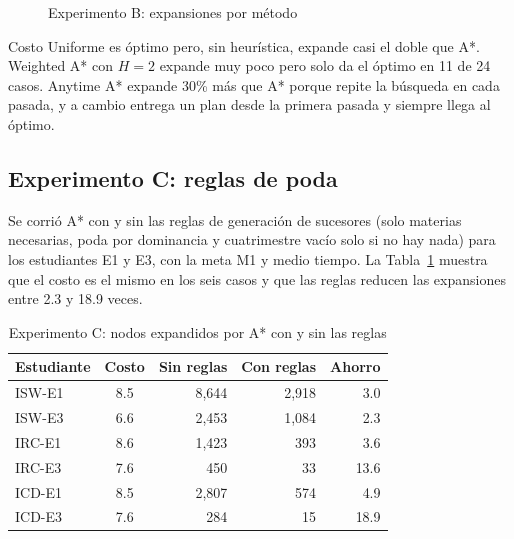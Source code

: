 \begin{figure}[H]
    \centering
    \caption{Experimento B: expansiones por método}
    \label{FIG::ExpB}
\end{figure}

Costo Uniforme es óptimo pero, sin heurística, expande casi el doble que A*. Weighted A* con $H = 2$ expande muy poco pero solo da el óptimo en 11 de 24 casos. Anytime A* expande 30\% más que A* porque repite la búsqueda en cada pasada, y a cambio entrega un plan desde la primera pasada y siempre llega al óptimo.

\subsection{Experimento C: reglas de poda}
Se corrió A* con y sin las reglas de generación de sucesores (solo materias necesarias, poda por dominancia y cuatrimestre vacío solo si no hay nada) para los estudiantes E1 y E3, con la meta M1 y medio tiempo. La Tabla~\ref{TAB::ExpC} muestra que el costo es el mismo en los seis casos y que las reglas reducen las expansiones entre 2.3 y 18.9 veces.

\begin{table}[H]
  \begin{center}
    \caption{Experimento C: nodos expandidos por A* con y sin las reglas}
    \label{TAB::ExpC}
    \begin{tabular}{|| l | c | r | r | r ||}
        \hline
        Estudiante & Costo & Sin reglas & Con reglas & Ahorro \\ [0.5ex]
        \hline\hline
        ISW-E1 & 8.5 & 8,644 & 2,918 & 3.0 \\
        \hline
        ISW-E3 & 6.6 & 2,453 & 1,084 & 2.3 \\
        \hline
        IRC-E1 & 8.6 & 1,423 & 393 & 3.6 \\
        \hline
        IRC-E3 & 7.6 & 450 & 33 & 13.6 \\
        \hline
        ICD-E1 & 8.5 & 2,807 & 574 & 4.9 \\
        \hline
        ICD-E3 & 7.6 & 284 & 15 & 18.9 \\
        \hline
    \end{tabular}
  \end{center}
\end{table}

